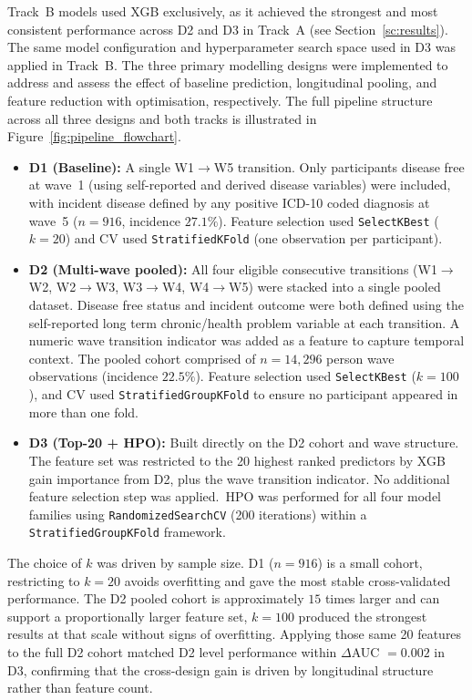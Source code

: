 Track~B models used \gls{XGB} exclusively, as it achieved the strongest and most consistent performance across D2 and D3 in Track~A (see Section~\ref{sc:results}). The same model configuration and hyperparameter search space used in D3 was applied in Track~B. The three primary modelling designs were implemented to address and assess the effect of baseline prediction, longitudinal pooling, and feature reduction with optimisation, respectively. The full pipeline structure across all three designs and both tracks is illustrated in Figure~\ref{fig:pipeline_flowchart}.
\begin{itemize}\label{three_designs}
\item[-] \textbf{D1 (Baseline):} A single W1$\rightarrow$W5 transition. Only participants disease free at wave~1 (using self-reported and derived disease variables) were included, with incident disease defined by any positive ICD-10 coded diagnosis at wave~5 ($n=916$, incidence $27.1\%$). Feature selection used \texttt{SelectKBest} ($k=20$) and \gls{CV} used \texttt{StratifiedKFold} (one observation per participant).
\item[-] \textbf{D2 (Multi-wave pooled):} All four eligible consecutive transitions (W1$\rightarrow$W2, W2$\rightarrow$W3, W3$\rightarrow$W4, W4$\rightarrow$W5) were stacked into a single pooled dataset. Disease free status and incident outcome were both defined using the self-reported long term chronic/health problem variable at each transition. A numeric wave transition indicator was added as a feature to capture temporal context. The pooled cohort comprised of $n=14{,}296$ person wave observations (incidence $22.5\%$). Feature selection used \texttt{SelectKBest} ($k=100$), and \gls{CV} used \texttt{StratifiedGroupKFold} to ensure no participant appeared in more than one fold.
\item[-] \textbf{D3 (Top-20 + \gls{HPO}):} Built directly on the D2 cohort and wave structure. The feature set was restricted to the 20 highest ranked predictors by \gls{XGB} gain importance from D2, plus the wave transition indicator. No additional feature selection step was applied.\ \gls{HPO} was performed for all four model families using \texttt{RandomizedSearchCV} (200 iterations) within a \texttt{StratifiedGroupKFold} framework.
\end{itemize}
The choice of $k$ was driven by sample size. D1 ($n=916$) is a small cohort, restricting to $k=20$ avoids overfitting and gave the most stable cross-validated performance. The D2 pooled cohort is approximately $15$ times larger and can support a proportionally larger feature set, $k=100$ produced the strongest results at that scale without signs of overfitting. Applying those same 20 features to the full D2 cohort matched D2 level performance within $\Delta$\gls{AUC} $= 0.002$ in D3, confirming that the cross-design gain is driven by longitudinal structure rather than feature count.

